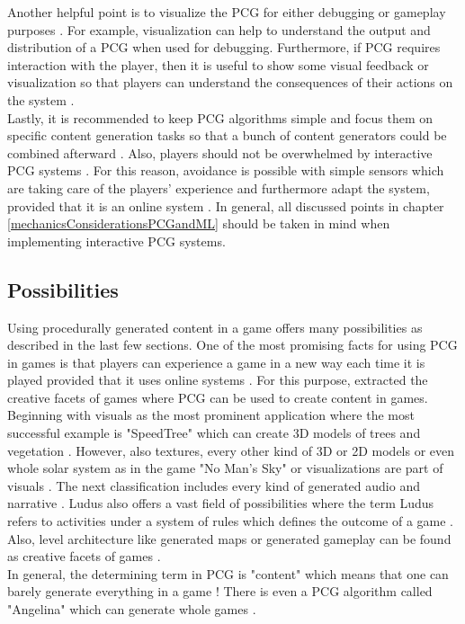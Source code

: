 \documentclass[MGS,Master,english]{twbook}%
\begin{document}
Another helpful point is to visualize the PCG for either debugging or gameplay purposes \cite{pcg::book}. For example, visualization can help to understand the output and distribution of a PCG when used for debugging. Furthermore, if PCG requires interaction with the player, then it is useful to show some visual feedback or visualization so that players can understand the consequences of their actions on the system \cite{pcg::endlessWeb}. \\
Lastly, it is recommended to keep PCG algorithms simple and focus them on specific content generation tasks so that a bunch of content generators could be combined afterward \cite{pcg::book}.  Also, players should not be overwhelmed by interactive PCG systems \cite{pcg::shortHistoryOfDynamicAndPCG}. For this reason, avoidance is possible with simple sensors which are taking care of the players' experience and furthermore adapt the system, provided that it is an online system \cite{pcg::shortHistoryOfDynamicAndPCG}.  In general, all discussed points in chapter \ref{mechanicsConsiderationsPCGandML} should be taken in mind when implementing interactive PCG systems.

\subsection{Possibilities}
Using procedurally generated content in a game offers many possibilities as described in the last few sections. One of the most promising facts for using PCG in games is that players can experience a game in a new way each time it is played provided that it uses online systems \cite{pcg::gamasutra::tips}. For this purpose, \citep{pcg::computationalGameCreativity} extracted the creative facets of games where PCG can be used to create content in games. Beginning with visuals as the most prominent application where the most successful example is "SpeedTree" \cite{speedTree} which can create \ac{3D} models of trees and vegetation \cite{pcg::computationalGameCreativity}. However, also textures, every other kind of 3D or \ac{2D} models or even whole solar system as in the game "No Man's Sky" \cite{game::noMansSky} or visualizations are part of visuals \cite{pcg::computationalGameCreativity}. The next classification includes every kind of generated audio and narrative \cite{pcg::computationalGameCreativity}. Ludus also offers a vast field of possibilities where the term Ludus refers to activities under a system of rules which defines the outcome of a game \cite{pcg::computationalGameCreativity}. Also, level architecture like generated maps or generated gameplay can be found as creative facets of games \cite{pcg::computationalGameCreativity}.\\
In general, the determining term in PCG is "content" which means that one can barely generate everything in a game \cite{pcg::book}! There is even a PCG algorithm called "Angelina" which can generate whole games \cite{pcg::angelina}.
\end{document}
